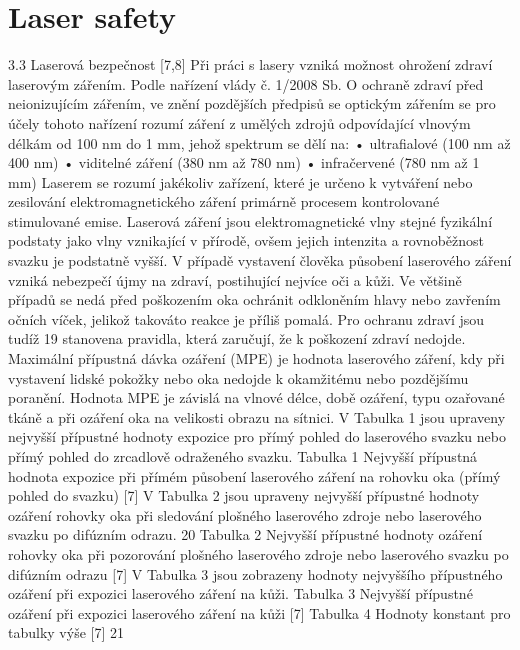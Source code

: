 \chapter{Laser safety}

3.3 Laserová bezpečnost [7,8]
Při práci s lasery vzniká možnost ohrožení zdraví laserovým zářením. Podle nařízení vlády
č. 1/2008 Sb. O ochraně zdraví před neionizujícím zářením, ve znění pozdějších předpisů se
optickým zářením se pro účely tohoto nařízení rozumí záření z umělých zdrojů odpovídající
vlnovým délkám od 100 nm do 1 mm, jehož spektrum se dělí na:
• ultrafialové (100 nm až 400 nm)
• viditelné záření (380 nm až 780 nm)
• infračervené (780 nm až 1 mm)
Laserem se rozumí jakékoliv zařízení, které je určeno k vytváření nebo zesilování
elektromagnetického záření primárně procesem kontrolované stimulované emise. Laserová
záření jsou elektromagnetické vlny stejné fyzikální podstaty jako vlny vznikající v přírodě,
ovšem jejich intenzita a rovnoběžnost svazku je podstatně vyšší. V případě vystavení člověka
působení laserového záření vzniká nebezpečí újmy na zdraví, postihující nejvíce oči a kůži.
Ve většině případů se nedá před poškozením oka ochránit odkloněním hlavy nebo
zavřením očních víček, jelikož takováto reakce je příliš pomalá. Pro ochranu zdraví jsou tudíž
19
stanovena pravidla, která zaručují, že k poškození zdraví nedojde. Maximální přípustná dávka
ozáření (MPE) je hodnota laserového záření, kdy při vystavení lidské pokožky nebo oka
nedojde k okamžitému nebo pozdějšímu poranění. Hodnota MPE je závislá na vlnové délce,
době ozáření, typu ozařované tkáně a při ozáření oka na velikosti obrazu na sítnici.
V Tabulka 1 jsou upraveny nejvyšší přípustné hodnoty expozice pro přímý pohled do
laserového svazku nebo přímý pohled do zrcadlově odraženého svazku.
Tabulka 1 Nejvyšší přípustná hodnota expozice při přímém působení laserového záření na rohovku oka
(přímý pohled do svazku) [7]
V Tabulka 2 jsou upraveny nejvyšší přípustné hodnoty ozáření rohovky oka při sledování
plošného laserového zdroje nebo laserového svazku po difúzním odrazu.
20
Tabulka 2 Nejvyšší přípustné hodnoty ozáření rohovky oka při pozorování plošného laserového zdroje
nebo laserového svazku po difúzním odrazu [7]
V Tabulka 3 jsou zobrazeny hodnoty nejvyššího přípustného ozáření při expozici
laserového záření na kůži.
Tabulka 3 Nejvyšší přípustné ozáření při expozici laserového záření na kůži [7]
Tabulka 4 Hodnoty konstant pro tabulky výše [7]
21
